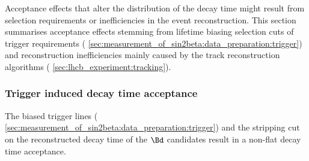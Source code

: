 Acceptance effects that alter the distribution of the decay time might result
from selection requirements or inefficiencies in the event reconstruction. This
section summarises acceptance effects stemming from lifetime biasing selection
cuts of trigger requirements (\cf
\cref{sec:measurement_of_sin2beta:data_preparation:trigger}) and reconstruction
inefficiencies mainly caused by the \VELO track reconstruction algorithms (\cf
\cref{sec:lhcb_experiment:tracking}).

\subsubsection{Trigger induced decay time acceptance}
\label{sec:measurement_of_sin2beta:resolution_and_acceptance:acceptance:lower}

The biased trigger lines (\cf
\cref{sec:measurement_of_sin2beta:data_preparation:trigger}) and the stripping
cut on the reconstructed decay time of the $\Bd$ candidates result in a non-flat
decay time acceptance.

